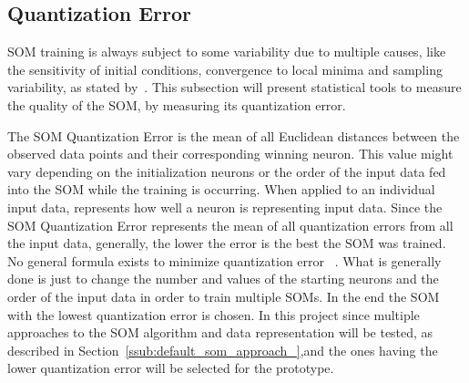 \subsection{Quantization Error} 
\label{sub:quantization_error}
SOM training is always subject to some variability due to multiple causes, like the sensitivity of initial conditions, convergence to local minima and sampling variability, as stated by~\citet{Bodt}. This subsection will present statistical tools to measure the quality of the SOM, by measuring its quantization error. 


The SOM Quantization Error is the mean of all Euclidean distances between the observed data points and their corresponding winning neuron. This value might vary depending on the initialization neurons or the order of the input data fed into the SOM while the training is occurring. When applied to an individual input data, represents how well a neuron is representing input data. Since the SOM Quantization Error represents the mean of all quantization errors from all the input data, generally, the lower the error is the best the SOM was trained.
\\
No general formula exists to minimize quantization error~\cite{Bodt} . What is generally done is just to change the number and values of the starting neurons and the order of the input data in order to train multiple SOMs. In the end the SOM with the lowest quantization error is chosen.
In this project since multiple approaches to the SOM algorithm and data representation will be tested, as described in Section~\ref{ssub:default_som_approach_},and the ones having the lower quantization error will be selected for the prototype.

